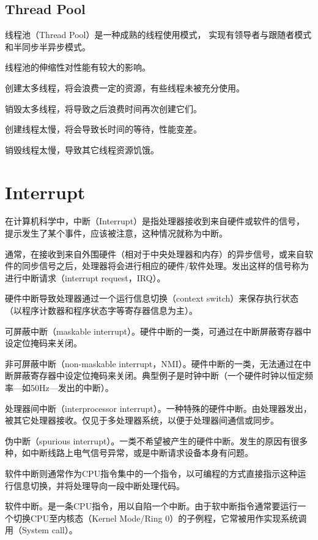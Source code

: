 \subsection{Thread Pool}

线程池（Thread Pool）是一种成熟的线程使用模式， 实现有领导者与跟随者模式和半同步半异步模式。

线程池的伸缩性对性能有较大的影响。

\begin{compactitem}
\item 创建太多线程，将会浪费一定的资源，有些线程未被充分使用。
\item 销毁太多线程，将导致之后浪费时间再次创建它们。
\item 创建线程太慢，将会导致长时间的等待，性能变差。
\item 销毁线程太慢，导致其它线程资源饥饿。
\end{compactitem}

\section{Interrupt}

在计算机科学中，中断（Interrupt）是指处理器接收到来自硬件或软件的信号，提示发生了某个事件，应该被注意，这种情况就称为中断。

通常，在接收到来自外围硬件（相对于中央处理器和内存）的异步信号，或来自软件的同步信号之后，处理器将会进行相应的硬件/软件处理。发出这样的信号称为进行中断请求（interrupt request，IRQ）。

\begin{compactitem}
\item 硬件中断导致处理器通过一个运行信息切换（context switch）来保存执行状态（以程序计数器和程序状态字等寄存器信息为主）。

\begin{compactenum}
\item 可屏蔽中断（maskable interrupt）。硬件中断的一类，可通过在中断屏蔽寄存器中设定位掩码来关闭。
\item 非可屏蔽中断（non-maskable interrupt，NMI）。硬件中断的一类，无法通过在中断屏蔽寄存器中设定位掩码来关闭。典型例子是时钟中断（一个硬件时钟以恒定频率—如50Hz—发出的中断）。
\item 处理器间中断（interprocessor interrupt）。一种特殊的硬件中断。由处理器发出，被其它处理器接收。仅见于多处理器系统，以便于处理器间通信或同步。
\item 伪中断（spurious interrupt）。一类不希望被产生的硬件中断。发生的原因有很多种，如中断线路上电气信号异常，或是中断请求设备本身有问题。
\end{compactenum}

\item 软件中断则通常作为CPU指令集中的一个指令，以可编程的方式直接指示这种运行信息切换，并将处理导向一段中断处理代码。

\begin{compactenum}
\item 软件中断。是一条CPU指令，用以自陷一个中断。由于软中断指令通常要运行一个切换CPU至内核态（Kernel Mode/Ring 0）的子例程，它常被用作实现系统调用（System call）。
\end{compactenum}

\end{compactitem}

